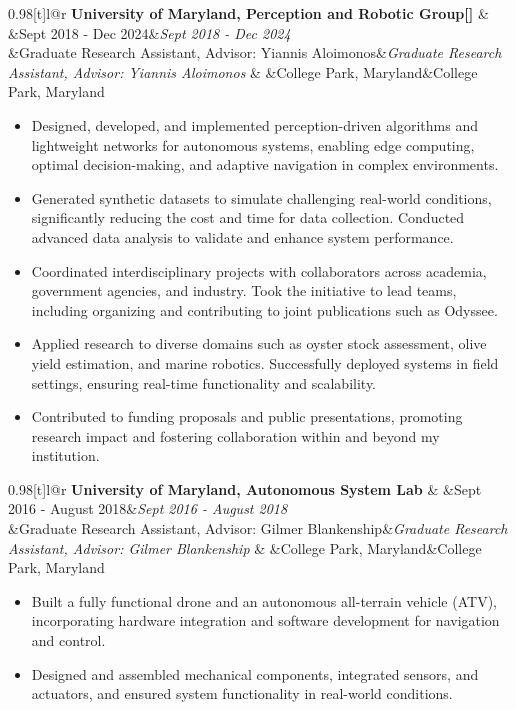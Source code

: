 \documentclass[a4paper,11pt]{article}
\makeatletter
\newcommand{\resumeSubheading}[4]{
\vspace{0.5mm}\item
    \begin{tabular*}{0.98\textwidth}[t]{l@{\extracolsep{\fill}}r}
        \textbf{#1} & \ifx&#4&\else \textit{\footnotesize{#4}} \fi \\
        \ifx&#3&\else \textit{\footnotesize{#3}} \fi & \ifx&#2&\else \footnotesize{#2} \fi \\
    \end{tabular*}
    \vspace{-2.4mm}
}
\newcommand{\resumeItemListStart}{\begin{itemize}[leftmargin=*,labelsep=1mm,itemsep=0.5mm]}
\newcommand{\resumeItemListEnd}{\end{itemize}\vspace{-2mm}}
\makeatother
\begin{document}
  \resumeSubheading
    {University of Maryland, Perception and Robotic Group[\href{https://prg.cs.umd.edu/}{\faIcon{globe}}]}{College Park, Maryland}
    {Graduate Research Assistant, Advisor: Yiannis Aloimonos}{Sept 2018 - Dec 2024}
    \resumeItemListStart
        \item Designed, developed, and implemented perception-driven algorithms and lightweight networks for autonomous systems, enabling edge computing, optimal decision-making, and adaptive navigation in complex environments.
    \item Generated synthetic datasets to simulate challenging real-world conditions, significantly reducing the cost and time for data collection. Conducted advanced data analysis to validate and enhance system performance.
    \item Coordinated interdisciplinary projects with collaborators across academia, government agencies, and industry. Took the initiative to lead teams, including organizing and contributing to joint publications such as Odyssee.
    \item Applied research to diverse domains such as oyster stock assessment, olive yield estimation, and marine robotics. Successfully deployed systems in field settings, ensuring real-time functionality and scalability.
    \item Contributed to funding proposals and public presentations, promoting research impact and fostering collaboration within and beyond my institution.
    \resumeItemListEnd
  \resumeSubheading
    {University of Maryland, Autonomous System Lab}{College Park, Maryland}
    {Graduate Research Assistant, Advisor: Gilmer Blankenship}{Sept 2016 - August 2018}
\resumeItemListStart
        \item Built a fully functional drone and an autonomous all-terrain vehicle (ATV), incorporating hardware integration and software development for navigation and control.
        \item Designed and assembled mechanical components, integrated sensors, and actuators, and ensured system functionality in real-world conditions.
\resumeItemListEnd
 
\end{document}
